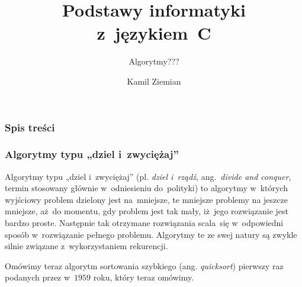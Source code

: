 \documentclass[10pt,t]{beamer}
\title{Podstawy informatyki z~językiem~C}
\subtitle{Algorytmy???}
\author{Kamil Ziemian \\
  \email}
\begin{document}





\RaggedRight





\maketitle





\begin{frame}
  \frametitle{Spis treści}


  \tableofcontents

\end{frame}










\begin{frame}
  \frametitle{Algorytmy typu „dziel i~zwyciężaj”}


  Algorytmy typu „dziel i~zwyciężaj” (pl. \textit{dziel i~rządź},
  ang.~\textit{divide and conquer}, termin stosowany głównie w~odniesieniu
  do~polityki) to algorytmy w~których wyjściowy problem dzielony jest
  na~mniejsze, te mniejsze problemy na jeszcze mniejsze, aż~do momentu,
  gdy problem jest tak mały, iż~jego rozwiązanie jest bardzo proste.
  Następnie tak otrzymane rozwiązania scala~się w~odpowiedni sposób
  w~rozwiązanie pełnego problemu. Algorytmy te ze swej natury są zwykle
  silnie związane z~wykorzystaniem rekurencji.

  Omówimy teraz algorytm sortowania szybkiego (ang. \textit{quicksort})
  pierwszy raz podanych przez
  w~$1959$ roku, który teraz omówimy.

\end{frame}
\end{document}
